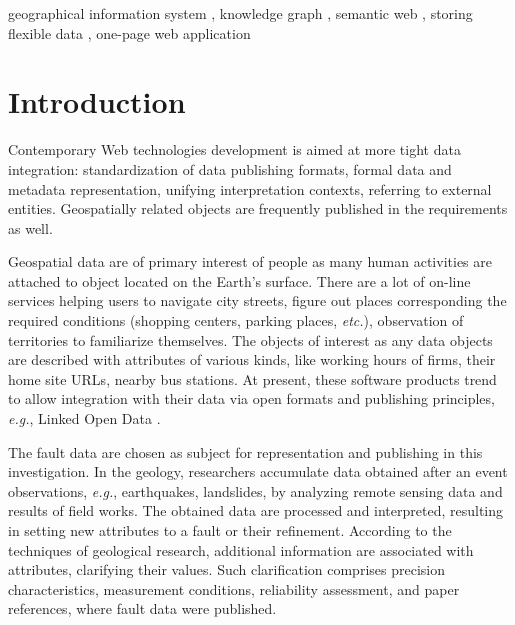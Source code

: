 \documentclass[
]{ceurart}
\begin{document}
\begin{keywords}
  geographical information system \sep
  knowledge graph \sep
  semantic web \sep
  storing flexible data \sep
  one-page web application
\end{keywords}

\maketitle

\section{Introduction}

Contemporary Web technologies development is aimed at more tight data integration: standardization of data publishing formats, formal data and metadata representation, unifying interpretation contexts, referring to external entities.  Geospatially related objects are frequently published in the requirements as well.

Geospatial data are of primary interest of people as many human activities are attached to object located on the Earth's surface.  There are a lot of on-line services helping users to navigate city streets, figure out places corresponding the required conditions (shopping centers, parking places, \emph{etc.}), observation of territories to familiarize themselves.  The objects of interest as any data objects are described with attributes of various kinds, like working hours of firms, their home site URLs, nearby bus stations.  At present, these software products trend to allow integration with their data via open formats and publishing principles, \emph{e.g.}, Linked Open Data \cite{lod}.

The fault data are chosen as subject for representation and publishing in this investigation.  In the geology, researchers accumulate data obtained after an event observations, \emph{e.g.}, earthquakes, landslides, by analyzing remote sensing data and results of field works.  The obtained data are processed and interpreted, resulting in setting new attributes to a fault or their refinement.  According to the techniques of geological research, additional information are associated with attributes, clarifying their values.  Such clarification comprises precision characteristics, measurement conditions, reliability assessment, and paper references, where fault data were published.
\end{document}
